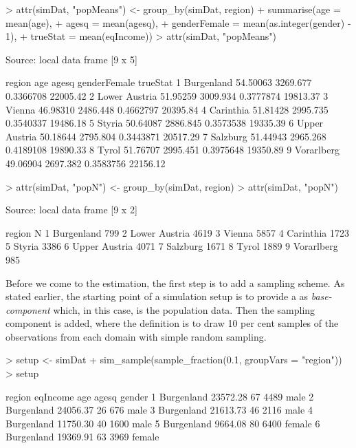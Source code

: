\documentclass[article]{ajs}
\begin{document}
\begin{Schunk}
\begin{Sinput}
> attr(simDat, "popMeans") <- group_by(simDat, region) %
+   summarise(age = mean(age),
+             agesq = mean(agesq),
+             genderFemale = mean(as.integer(gender) - 1),
+             trueStat = mean(eqIncome))
> attr(simDat, "popMeans")
\end{Sinput}
\begin{Soutput}
Source: local data frame [9 x 5]

         region      age    agesq genderFemale trueStat
1    Burgenland 54.50063 3269.677    0.3366708 22005.42
2 Lower Austria 51.95259 3009.934    0.3777874 19813.37
3        Vienna 46.98310 2486.448    0.4662797 20395.84
4     Carinthia 51.81428 2995.735    0.3540337 19486.18
5        Styria 50.64087 2886.845    0.3573538 19335.39
6 Upper Austria 50.18644 2795.804    0.3443871 20517.29
7      Salzburg 51.44943 2965.268    0.4189108 19890.33
8         Tyrol 51.76707 2995.451    0.3975648 19350.89
9    Vorarlberg 49.06904 2697.382    0.3583756 22156.12
\end{Soutput}
\begin{Sinput}
> attr(simDat, "popN") <- group_by(simDat, region) %
> attr(simDat, "popN")
\end{Sinput}
\begin{Soutput}
Source: local data frame [9 x 2]

         region    N
1    Burgenland  799
2 Lower Austria 4619
3        Vienna 5857
4     Carinthia 1723
5        Styria 3386
6 Upper Austria 4071
7      Salzburg 1671
8         Tyrol 1889
9    Vorarlberg  985
\end{Soutput}
\end{Schunk}

Before we come to the estimation, the first step is to add a sampling scheme. As stated earlier, the starting point of a simulation setup is to provide a  as \textit{base-component} which, in this case, is the population data. Then the sampling component is added, where the definition is to draw 10 per cent samples of the observations from each domain with simple random sampling.

\begin{Schunk}
\begin{Sinput}
> setup <- simDat %
+   sim_sample(sample_fraction(0.1, groupVars = "region"))
> setup
\end{Sinput}
\begin{Soutput}
      region eqIncome age agesq gender
1 Burgenland 23572.28  67  4489   male
2 Burgenland 24056.37  26   676   male
3 Burgenland 21613.73  46  2116   male
4 Burgenland 11750.30  40  1600   male
5 Burgenland  9664.08  80  6400 female
6 Burgenland 19369.91  63  3969 female
\end{Soutput}
\end{Schunk}
\end{document}

